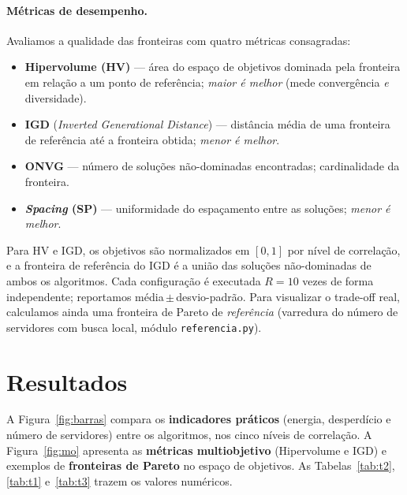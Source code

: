 \documentclass[11pt]{article}
\begin{document}
\paragraph{Métricas de desempenho.} Avaliamos a qualidade das fronteiras com
quatro métricas consagradas:
\begin{itemize}[leftmargin=1.4em,itemsep=1pt]
  \item \textbf{Hipervolume (HV)} --- área do espaço de objetivos dominada pela
  fronteira em relação a um ponto de referência; \emph{maior é melhor} (mede
  convergência \emph{e} diversidade).
  \item \textbf{IGD} (\emph{Inverted Generational Distance}) --- distância média
  de uma fronteira de referência até a fronteira obtida; \emph{menor é melhor}.
  \item \textbf{ONVG} --- número de soluções não-dominadas encontradas;
  cardinalidade da fronteira.
  \item \textbf{\emph{Spacing} (SP)} --- uniformidade do espaçamento entre as
  soluções; \emph{menor é melhor}.
\end{itemize}
Para HV e IGD, os objetivos são normalizados em $[0,1]$ por nível de correlação, e
a fronteira de referência do IGD é a união das soluções não-dominadas de ambos os
algoritmos. Cada configuração é executada $R=10$ vezes de forma independente;
reportamos média\,$\pm$\,desvio-padrão. Para visualizar o trade-off real, calculamos ainda uma fronteira de Pareto de \emph{referência} (varredura do número de servidores com busca local, módulo \texttt{referencia.py}).

\section{Resultados}
A Figura~\ref{fig:barras} compara os \textbf{indicadores práticos} (energia,
desperdício e número de servidores) entre os algoritmos, nos cinco níveis de
correlação. A Figura~\ref{fig:mo} apresenta as \textbf{métricas multiobjetivo}
(Hipervolume e IGD) e exemplos de \textbf{fronteiras de Pareto} no espaço de
objetivos. As Tabelas~\ref{tab:t2}, \ref{tab:t1} e~\ref{tab:t3} trazem os valores
numéricos.
\end{document}
